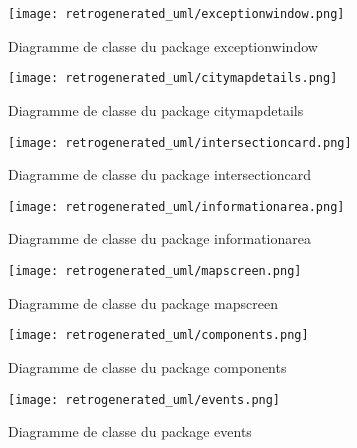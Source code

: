 \begin{figure}[h!]
    		\begin{center}
      			\texttt{[image: retrogenerated\_uml/exceptionwindow.png]}
      			\caption{Diagramme de classe du package exceptionwindow}
    		\end{center}
  	\end{figure}
\begin{figure}[h!]
    		\begin{center}
      			\texttt{[image: retrogenerated\_uml/citymapdetails.png]}
      			\caption{Diagramme de classe du package citymapdetails}
    		\end{center}
  	\end{figure}
\begin{figure}[h!]
    		\begin{center}
      			\texttt{[image: retrogenerated\_uml/intersectioncard.png]}
      			\caption{Diagramme de classe du package intersectioncard}
    		\end{center}
  	\end{figure}
\begin{figure}[h!]
    		\begin{center}
      			\texttt{[image: retrogenerated\_uml/informationarea.png]}
      			\caption{Diagramme de classe du package informationarea}
    		\end{center}
  	\end{figure}
\begin{figure}[h!]
    		\begin{center}
      			\texttt{[image: retrogenerated\_uml/mapscreen.png]}
      			\caption{Diagramme de classe du package mapscreen}
    		\end{center}
  	\end{figure}
\begin{figure}[h!]
    		\begin{center}
      			\texttt{[image: retrogenerated\_uml/components.png]}
      			\caption{Diagramme de classe du package components}
    		\end{center}
  	\end{figure}
\begin{figure}[h!]
    		\begin{center}
      			\texttt{[image: retrogenerated\_uml/events.png]}
      			\caption{Diagramme de classe du package events}
    		\end{center}
  	\end{figure}
